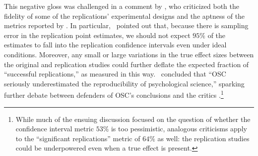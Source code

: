 \documentclass[11pt]{article}
\theoremstyle{definition}
\theoremstyle{custom}
\begin{document}
  This negative gloss was challenged in a comment by \citet{Gilbert:2016he}, who criticized both the fidelity of some of the replications' experimental designs and the aptness of the metrics reported by \citet{OpenScienceCollaboration:2015cn}. In particular, \citeauthor{Gilbert:2016he}\ pointed out that, because there is sampling error in the replication point estimates, we should not expect $95\%$ of the estimates to fall into the replication confidence intervals even under ideal conditions. Moreover, any small or large variations in the true effect sizes between the original and replication studies could further deflate the expected fraction of ``successful replications,'' as measured in this way. \citeauthor{Gilbert:2016he}\ concluded that ``OSC seriously underestimated the reproducibility of psychological science,'' sparking further debate between defenders of OSC's conclusions \citep{Anderson:2016gs,Srivastava:2016,Nosek:2016} and the critics \citep{Gilbert:2016uv,Gilbert:2016th}.\footnote{While much of the ensuing discussion focused on the question of whether the confidence interval metric $53\%$ is too pessimistic, analogous criticisms apply to the ``significant replications'' metric of $64\%$ as well: the replication studies could be underpowered even when a true effect is present.}
\end{document}
